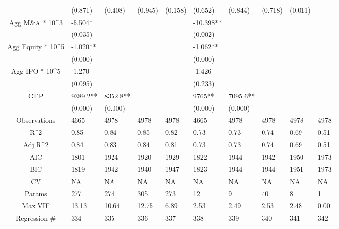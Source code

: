 \documentclass{article}
\begin{document}
\begin{table}[H]
\begin{tabular}{|clllllllll|}
   & (0.871) & (0.408) & (0.945) & (0.158) & (0.652) & (0.844) & (0.718) & (0.011) &  \\
  Agg M\&A * 10^3 & -5.504* &  &  &  & -10.398** &  &  &  &  \\
   & (0.035) &  &  &  & (0.002) &  &  &  &  \\
  Agg Equity * 10^5 & -1.020** &  &  &  & -1.062** &  &  &  &  \\
   & (0.000) &  &  &  & (0.000) &  &  &  &  \\
  Agg IPO * 10^5 & -1.270$^{+}$ &  &  &  & -1.426 &  &  &  &  \\
   & (0.095) &  &  &  & (0.233) &  &  &  &  \\
  GDP & 9389.2** & 8352.8** &  &  & 9765** & 7095.6** &  &  &  \\
   & (0.000) & (0.000) &  &  & (0.000) & (0.000) &  &  &  \\
  \hline
 Observations & 4665 & 4978 & 4978 & 4978 & 4665 & 4978 & 4978 & 4978 & 4978 \\
  R^2 & 0.85 & 0.84 & 0.85 & 0.82 & 0.73 & 0.73 & 0.74 & 0.69 & 0.51 \\
  Adj R^2 & 0.84 & 0.83 & 0.84 & 0.81 & 0.73 & 0.73 & 0.74 & 0.69 & 0.51 \\
  AIC & 1801 & 1924 & 1920 & 1929 & 1822 & 1944 & 1942 & 1950 & 1973 \\
  BIC & 1819 & 1942 & 1940 & 1947 & 1823 & 1944 & 1944 & 1951 & 1973 \\
  CV & NA & NA & NA & NA & NA & NA & NA & NA & NA \\
  Params & 277 & 274 & 305 & 273 & 12 & 9 & 40 & 8 & 1 \\
  Max VIF & 13.13 & 10.64 & 12.75 & 6.89 & 2.53 & 2.49 & 2.53 & 2.48 & 0.00 \\
  Regression \# & 334 & 335 & 336 & 337 & 338 & 339 & 340 & 341 & 342 \\
   \hline
\end{tabular}

\end{table}
\end{document}
